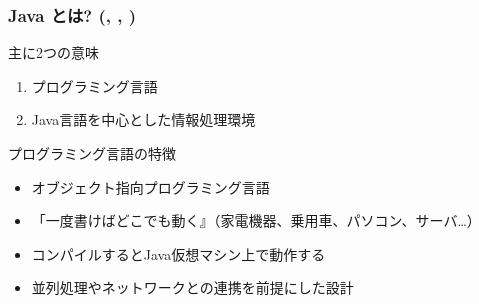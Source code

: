 \documentclass[dvipdfmx]{beamer}
\begin{document}
\begin{frame}
    \frametitle{Java とは? (\cite{java-bible}, \cite{oracle-java}, \cite{java-magazine})}

    \begin{block}{主に2つの意味}
        \begin{enumerate}
         \item プログラミング言語
         \item Java言語を中心とした情報処理環境
        \end{enumerate}
    \end{block}

    \begin{block}{プログラミング言語の特徴}
        \begin{itemize}
            \item オブジェクト指向プログラミング言語
            \item 「一度書けばどこでも動く』（家電機器、乗用車、パソコン、サーバ\dots）
            \item コンパイルするとJava仮想マシン上で動作する
            \item 並列処理やネットワークとの連携を前提にした設計
        \end{itemize}
    \end{block}
\end{frame}
\end{document}
